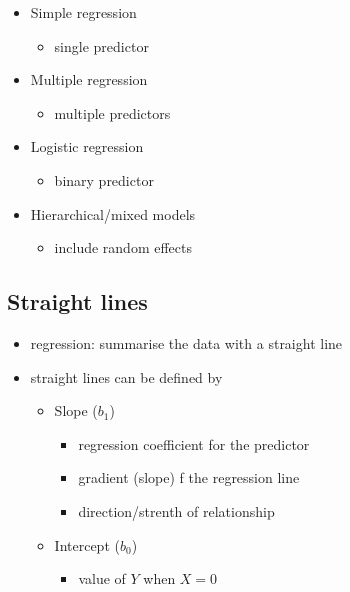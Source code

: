 \documentclass[
  letterpaper,
  DIV=11,
  numbers=noendperiod]{scrartcl}
\providecommand{\tightlist}{%
  \setlength{\itemsep}{0pt}\setlength{\parskip}{0pt}}\usepackage{longtable,booktabs,array}
\begin{document}
\begin{itemize}
\tightlist
\item
  Simple regression

  \begin{itemize}
  \tightlist
  \item
    single predictor
  \end{itemize}
\item
  Multiple regression

  \begin{itemize}
  \tightlist
  \item
    multiple predictors
  \end{itemize}
\item
  Logistic regression

  \begin{itemize}
  \tightlist
  \item
    binary predictor
  \end{itemize}
\item
  Hierarchical/mixed models

  \begin{itemize}
  \tightlist
  \item
    include random effects
  \end{itemize}
\end{itemize}

\hypertarget{straight-lines}{%
\subsection{Straight lines}\label{straight-lines}}

\begin{itemize}
\tightlist
\item
  regression: summarise the data with a straight line
\item
  straight lines can be defined by

  \begin{itemize}
  \tightlist
  \item
    Slope (\(b_1\))

    \begin{itemize}
    \tightlist
    \item
      regression coefficient for the predictor
    \item
      gradient (slope) f the regression line
    \item
      direction/strenth of relationship
    \end{itemize}
  \item
    Intercept (\(b_0\))

    \begin{itemize}
    \tightlist
    \item
      value of \(Y\) when \(X = 0\)
    \end{itemize}
  \end{itemize}
\end{itemize}
\end{document}
